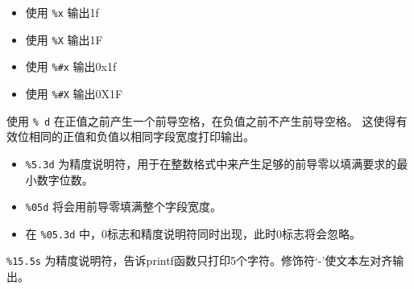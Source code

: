 \begin{frame}[fragile] 

\begin{itemize}
\item 使用 \lstinline|%x| 输出1f
\item 使用 \lstinline|%X| 输出1F
\item 使用 \lstinline|%#x| 输出0x1f
\item 使用 \lstinline|%#X| 输出0X1F
\end{itemize}
\end{frame}

\begin{frame}[fragile] 
  使用 \lstinline|% d| 在正值之前产生一个前导空格，在负值之前不产生前导空格。
这使得有效位相同的正值和负值以相同字段宽度打印输出。
\end{frame}

\begin{frame}[fragile] 
\begin{itemize}
\item\lstinline|%5.3d| 为精度说明符，用于在整数格式中来产生足够的前导零以填满要求的最小数字位数。\\[0.1in]
\item \lstinline|%05d| 将会用前导零填满整个字段宽度。\\[0.1in]
\item 在 \lstinline|%05.3d| 中，0标志和精度说明符同时出现，此时0标志将会忽略。
\end{itemize}
\end{frame}

%     


\begin{frame}[fragile]
\lstinline|%15.5s| 为精度说明符，告诉printf函数只打印5个字符。修饰符‘-’使文本左对齐输出。
\end{frame}

% 

